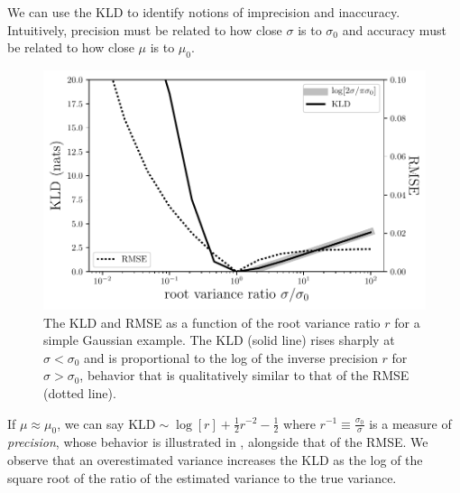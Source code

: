We can use the KLD to identify notions of imprecision and inaccuracy.
Intuitively, precision must be related to how close $\sigma$ is to $\sigma_{0}$ 
and accuracy must be related to how close $\mu$ is to $\mu_{0}$.

\begin{figure}
	\begin{center}
		\includegraphics[width=\columnwidth]{figures/qp/precision.pdf}
		\caption{The KLD and RMSE as a function of the root variance ratio $r$ for 
			a simple Gaussian example.
			The KLD (solid line) rises sharply at $\sigma<\sigma_{0}$ and is 
			proportional to the log of the inverse precision $r$ for $\sigma>\sigma_{0}$, 
			behavior that is qualitatively similar to that of the RMSE (dotted line).
			}
	\end{center}
\end{figure}

If $\mu\approx\mu_{0}$, we can say $\mathrm{KLD}\sim\log[r] + \frac{1}{2}r^{-2} 
- \frac{1}{2}$ where $r^{-1}\equiv\frac{\sigma_{0}}{\sigma}$ is a measure of 
\textit{precision}, whose behavior is illustrated in 
, alongside that of the RMSE.  We observe that an 
overestimated variance increases the KLD as the log of the square root of the 
ratio of the estimated variance to the true variance.

